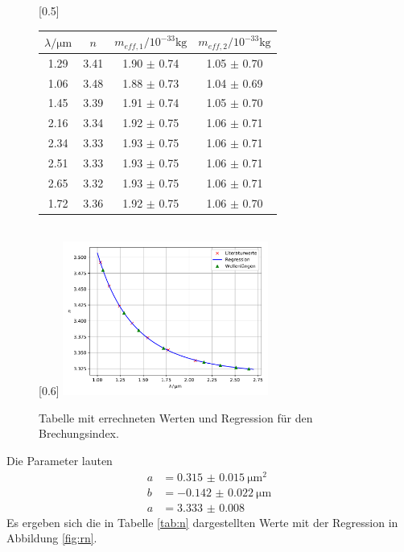 \begin{figure}
  \centering
  [0.5\textwidth]{
  \centering
  \begin{tabular}{c c c c}
    \toprule
    $\lambda / \si{\micro\meter}$ & $n$ & $m_{eff, 1} / 10^{-33}\si{\kilo\gram}$
    & $m_{eff, 2} / 10^{-33}\si{\kilo\gram}$ \\
    \midrule
    1.29 & 3.41 & 1.90 $\pm$ 0.74 & 1.05 $\pm$ 0.70 \\
    1.06 & 3.48 & 1.88 $\pm$ 0.73 & 1.04 $\pm$ 0.69 \\
    1.45 & 3.39 & 1.91 $\pm$ 0.74 & 1.05 $\pm$ 0.70 \\
    2.16 & 3.34 & 1.92 $\pm$ 0.75 & 1.06 $\pm$ 0.71 \\
    2.34 & 3.33 & 1.93 $\pm$ 0.75 & 1.06 $\pm$ 0.71 \\
    2.51 & 3.33 & 1.93 $\pm$ 0.75 & 1.06 $\pm$ 0.71 \\
    2.65 & 3.32 & 1.93 $\pm$ 0.75 & 1.06 $\pm$ 0.71 \\
    1.72 & 3.36 & 1.92 $\pm$ 0.75 & 1.06 $\pm$ 0.70 \\
    \bottomrule
  \end{tabular}
  }
  \\
  [0.6\textwidth]{
  \centering
  \includegraphics[width=0.6\textwidth]{dispersion.pdf}
  }
  \caption{Tabelle mit errechneten Werten und Regression für den Brechungsindex.}
  \label{fig:n}
\end{figure}
Die Parameter lauten
\begin{align*}
  a &= \SI{0.315(15)}{\micro\meter\squared} \\
  b &= \SI{-0.142(22)}{\micro\meter} \\
  a &= \num{3.333(8)}
\end{align*}
Es ergeben sich die in Tabelle \ref{tab:n} dargestellten Werte mit der Regression
in Abbildung \ref{fig:rn}.

